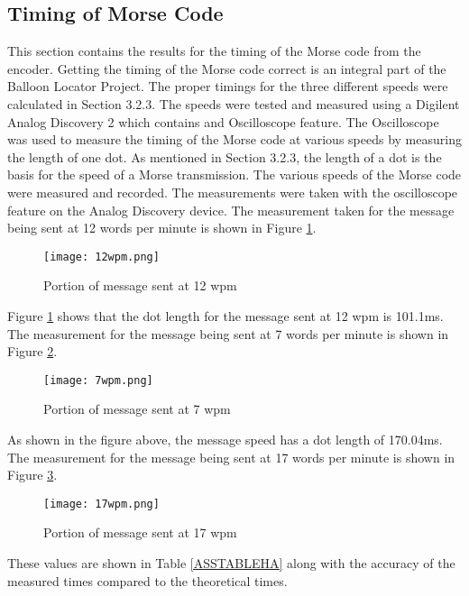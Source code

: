 \documentclass[12pt, letterpaper]{article}
\begin{document}
\subsection{Timing of Morse Code}
This section contains the results for the timing of the Morse code from the encoder. Getting the timing of the Morse code correct is an integral part of the Balloon Locator Project. The proper timings for the three different speeds were calculated in Section 3.2.3. The speeds were tested and measured using a Digilent Analog Discovery 2 which contains and Oscilloscope feature. The Oscilloscope was used to measure the timing of the Morse code at various speeds by measuring the length of one dot. As mentioned in Section 3.2.3, the length of a dot is the basis for the speed of a Morse transmission. The various speeds of the Morse code were measured and recorded. The measurements were taken with the oscilloscope feature on the Analog Discovery device. The measurement taken for the message being sent at 12 words per minute is shown in Figure \ref{12wpmfigureass}.

\begin{figure}[H]
    \centering
    \texttt{[image: 12wpm.png]}
    \caption{Portion of message sent at 12 wpm}
    \label{12wpmfigureass}
\end{figure}

Figure \ref{12wpmfigureass} shows that the dot length for the message sent at 12 wpm is 101.1ms. The measurement for the message being sent at 7 words per minute is shown in Figure \ref{7wpmfigureass}.

\begin{figure}[H]
    \centering
    \texttt{[image: 7wpm.png]}
    \caption{Portion of message sent at 7 wpm}
    \label{7wpmfigureass}
\end{figure}

As shown in the figure above, the message speed has a dot length of 170.04ms. The measurement for the message being sent at 17 words per minute is shown in Figure \ref{17wpmfigureass}.

\begin{figure}[H]
    \centering
    \texttt{[image: 17wpm.png]}
    \caption{Portion of message sent at 17 wpm}
    \label{17wpmfigureass}
\end{figure}

These values are shown in Table \ref{ASSTABLEHA} along with the accuracy of the measured times compared to the theoretical times.\\
\end{document}
